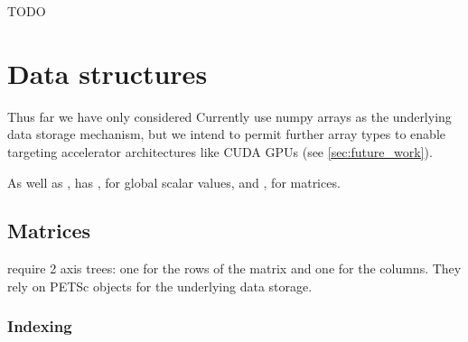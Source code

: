 \documentclass[thesis]{subfiles}
\begin{document}
\begin{example}

\begin{listing}
  \centering
  \begin{minipage}{.8\textwidth}
    \inputminted{c}{./scripts/artefacts/codegen_example2_c_code_tidy.c}
  \end{minipage}
  \caption{
    TODO
  }
  \label{listing:codegen_example2_c_code}
\end{listing}


\end{example}

\section{Data structures}
\label{sec:data_structures}

Thus far we have only considered
Currently  use numpy arrays as the underlying data storage mechanism, but we intend to permit further array types to enable targeting accelerator architectures like CUDA GPUs (see \cref{sec:future_work}).

As well as ,  has , for global scalar values, and , for matrices.


\subsection{Matrices}


 require 2 axis trees: one for the rows of the matrix and one for the columns.
They rely on PETSc  objects for the underlying data storage.

\subsubsection{Indexing}
\end{document}
